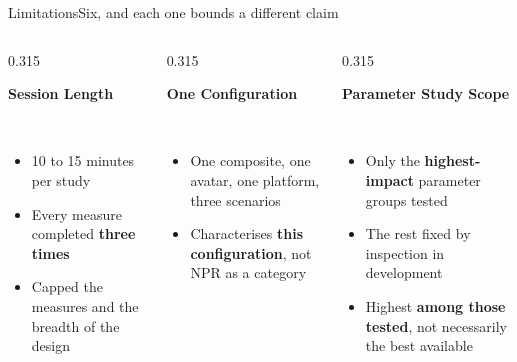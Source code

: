 \documentclass[aspectratio=169,10pt]{beamer}
\newcommand{\hl}[1]{{\color{knblue}\textbf{#1}}}
\newcommand{\bad}[1]{{\color{knred}\textbf{#1}}}
\newcommand{\panelhead}[1]{\noindent\colorbox{kncyan}{\parbox{0.96\textwidth}{\centering\vspace{1pt}\color{white}\scriptsize\bfseries #1\vspace{1pt}}}\\[0.25em]}
\newcommand{\panel}[1]{\noindent\colorbox{knlight}{\parbox{0.96\textwidth}{\vspace{2pt}\scriptsize
\begin{itemize}\setlength{\itemsep}{0.2em}\setlength{\leftmargini}{1.1em}#1\end{itemize}\vspace{2pt}}}}
\begin{document}
\begin{frame}{Limitations}{Six, and each one bounds a different claim}
  \vspace{0.2em}
  \begin{columns}[T]
    \begin{column}{0.315\textwidth}
      \panelhead{Session Length}
      \panel{%
        \item 10 to 15 minutes per study
        \item Every measure completed \hl{three times}
        \item Capped the measures and the breadth of the design}
    \end{column}
    \begin{column}{0.315\textwidth}
      \panelhead{One Configuration}
      \panel{%
        \item One composite, one avatar, one platform, three scenarios
        \item Characterises \hl{this configuration}, not NPR as a category}
    \end{column}
    \begin{column}{0.315\textwidth}
      \panelhead{Parameter Study Scope}
      \panel{%
        \item Only the \hl{highest-impact} parameter groups tested
        \item The rest fixed by inspection in development
        \item Highest \bad{among those tested}, not necessarily the best available}
    \end{column}
  \end{columns}
  \vspace{0.35em}


\end{frame}
\end{document}
